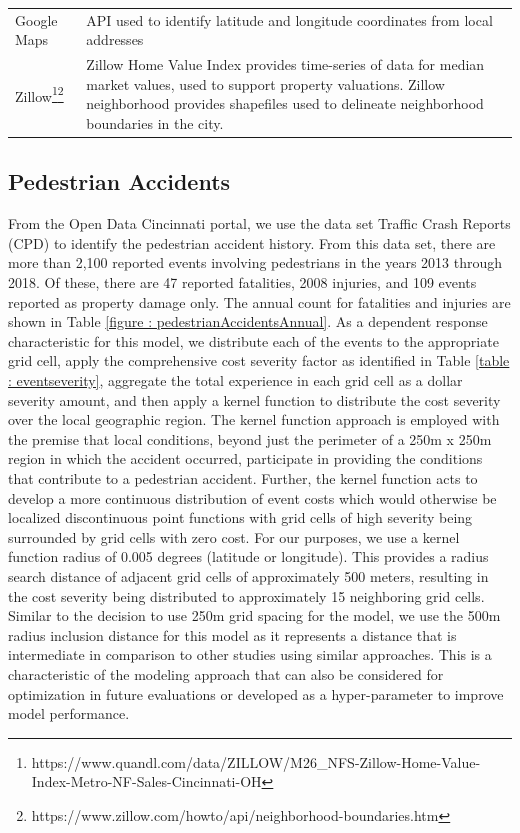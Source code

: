\documentclass{llncs}
\begin{document}
{\begin{longtable}{ p{} p{}}
Google Maps
	& API used to identify latitude and longitude coordinates from local addresses \\
	
	
Zillow\footnote{https://www.quandl.com/data/ZILLOW/M26_NFS-Zillow-Home-Value-Index-Metro-NF-Sales-Cincinnati-OH}\footnote{https://www.zillow.com/howto/api/neighborhood-boundaries.htm}
	& Zillow Home Value Index provides time-series of data for median market values, used to support property valuations. Zillow neighborhood provides shapefiles used to delineate neighborhood boundaries in the city. \\[2pt]
\hline
\end{longtable}
} %



\subsection{Pedestrian Accidents}\label{subsectionPedestrianAccidents}

From the Open Data Cincinnati portal, we use the data set Traffic Crash Reports (CPD) to identify the pedestrian accident history. From this data set, there are more than 2,100 reported events involving pedestrians in the years 2013 through 2018. Of these, there are 47 reported fatalities, 2008 injuries, and 109 events reported as property damage only. The annual count for fatalities and injuries are shown in Table \ref{figure : pedestrianAccidentsAnnual}. As a dependent response characteristic for this model, we distribute each of the events to the appropriate grid cell, apply the comprehensive cost severity factor as identified in Table \ref{table : eventseverity}, aggregate the total experience in each grid cell as a dollar severity amount, and then apply a kernel function to distribute the cost severity over the local geographic region. The kernel function approach is employed with the premise that local conditions, beyond just the perimeter of a 250m x 250m region in which the accident occurred, participate in providing the conditions that contribute to a pedestrian accident. Further, the kernel function acts to develop a more continuous distribution of event costs which would otherwise be localized discontinuous point functions with grid cells of high severity being surrounded by grid cells with zero cost. For our purposes, we use a kernel function radius of 0.005 degrees (latitude or longitude). This provides a radius search distance of adjacent grid cells of approximately 500 meters, resulting in the cost severity being distributed to approximately 15 neighboring grid cells.  Similar to the decision to use 250m grid spacing for the model, we use the 500m radius inclusion distance for this model as it represents a distance that is intermediate in comparison to other studies using similar approaches. This is a characteristic of the modeling approach that can also be considered for optimization in future evaluations or developed as a hyper-parameter to improve model performance.
\end{document}

